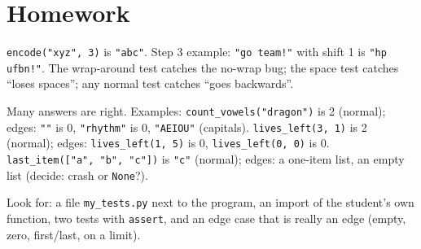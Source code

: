 \section{Homework}
\begin{answer}
\texttt{encode("xyz", 3)} is \texttt{"abc"}. Step 3 example: \texttt{"go team!"} with shift 1 is \texttt{"hp ufbn!"}.
The wrap-around test catches the no-wrap bug; the space test catches \enquote{loses spaces}; any normal test catches \enquote{goes backwards}.
\end{answer}

\begin{answer}
Many answers are right. Examples: \texttt{count\_vowels("dragon")} is 2 (normal); edges: \texttt{""} is 0, \texttt{"rhythm"} is 0, \texttt{"AEIOU"} (capitals).
\texttt{lives\_left(3, 1)} is 2 (normal); edges: \texttt{lives\_left(1, 5)} is 0, \texttt{lives\_left(0, 0)} is 0.
\texttt{last\_item(["a", "b", "c"])} is \texttt{"c"} (normal); edges: a one-item list, an empty list (decide: crash or \texttt{None}?).
\end{answer}

\begin{answer}[Creative]
Look for: a file \texttt{my\_tests.py} next to the program, an import of the student's own function, two tests with \texttt{assert},
and an edge case that is really an edge (empty, zero, first/last, on a limit).
\end{answer}
